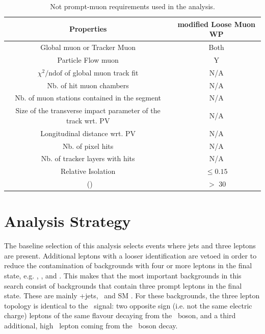 \begin{table}[htbp]
	\centering
	\caption{Not prompt-muon requirements used in the analysis. }
	
	\begin{tabular}{cc}
		\toprule
	 Properties	& modified Loose Muon WP \\ 
		\midrule 
		Global muon or Tracker Muon & Both  \\ 
		
		Particle Flow muon & Y  \\ 
		
		$\chi^2/\mathrm{ndof}$ of global muon track fit & N/A \\  
		
		Nb. of hit muon chambers & N/A \\ 
		 
		Nb. of muon stations contained in the segment & N/A   \\ 
		
		Size of the transverse impact parameter  of the track wrt. PV & N/A  \\ 
		 
		Longitudinal distance wrt. PV & N/A \\ 
		
		Nb. of pixel hits & N/A \\ 
		
		Nb. of tracker layers with hits & N/A  \\ 
		
		Relative Isolation & $\leq 0.15$ \\
		
		\pt\ (\GeV) &$>$ 30  \\
		\bottomrule
	\end{tabular} 
	
	\label{tab:nonpromptmu}
\end{table}


\newpage
\section{Analysis Strategy}
\label{sec:regions}

The baseline selection of this analysis selects events where jets and three leptons are present. Additional leptons with a looser identification are vetoed in order to reduce the contamination of backgrounds with four or more leptons in the final state, e.g. \ZZ, \ttZ, and \ttH. This makes that the most important backgrounds in this search consist of backgrounds  that contain three prompt leptons in the final state. These are mainly \WZ +jets, \ttZ\ and SM \tZq. For these backgrounds, the three lepton topology is identical to the \FCNC\ signal: two opposite sign (i.e. not the same electric charge) leptons of the same flavour decaying from the \PZ\ boson, and a third additional, high \pt\ lepton coming from the \PW\ boson decay.

